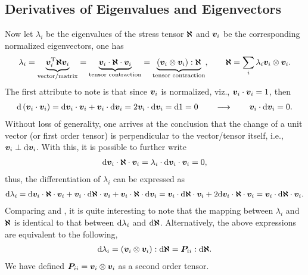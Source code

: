 \subsection{Derivatives of Eigenvalues and Eigenvectors}\label{sec:derivative_eigen}
Now let $\lambda_i$ be the eigenvalues of the stress tensor $\bm{\aleph}$ and $\bm{v}_i$ be the corresponding normalized eigenvectors, one has
\begin{gather}\label{eq:eigenvalue_def}
    \lambda_i=\underbrace{\bm{v}_i^{\mathrm{T}}\bm{\aleph}\bm{v}_i}_{\text{vector/matrix}}=\underbrace{\bm{v}_i\cdot\bm{\aleph}\cdot\bm{v}_i}_{\text{tensor contraction}}=\underbrace{\left(\bm{v}_i\otimes\bm{v}_i\right):\bm{\aleph}}_{\text{tensor contraction}},\qquad
    \bm{\aleph}=\sum_{i}\lambda_i\bm{v}_i\otimes\bm{v}_i.
\end{gather}
The first attribute to note is that since $\bm{v}_i$ is normalized, viz., $\bm{v}_i\cdot\bm{v}_i=1$, then
\begin{gather}
    \mathrm{d}\left(\bm{v}_i\cdot\bm{v}_i\right)=\mathrm{d}\bm{v}_i\cdot\bm{v}_i+\bm{v}_i\cdot\mathrm{d}\bm{v}_i=2\bm{v}_i\cdot\mathrm{d}\bm{v}_i=\mathrm{d}1=0\qquad\longrightarrow\qquad\bm{v}_i\cdot\mathrm{d}\bm{v}_i=0.
\end{gather}
Without loss of generality, one arrives at the conclusion that the change of a unit vector (or first order tensor) is perpendicular to the vector/tensor itself, i.e., $\bm{v}_i\perp\mathrm{d}\bm{v}_i$.
With this, it is possible to further write
\begin{gather}
    \mathrm{d}\bm{v}_i\cdot\bm{\aleph}\cdot\bm{v}_i=\lambda_i\cdot\mathrm{d}\bm{v}_i\cdot\bm{v}_i=0,
\end{gather}
thus, the differentiation of $\lambda_i$ can be expressed as
\begin{gather}\label{eq:eigenvalue_diff_def}
    \mathrm{d}\lambda_i=\mathrm{d}\bm{v}_i\cdot\bm{\aleph}\cdot\bm{v}_i+\bm{v}_i\cdot\mathrm{d}\bm{\aleph}\cdot\bm{v}_i+\bm{v}_i\cdot\bm{\aleph}\cdot\mathrm{d}\bm{v}_i=\bm{v}_i\cdot\mathrm{d}\bm{\aleph}\cdot\bm{v}_i+2\mathrm{d}\bm{v}_i\cdot\bm{\aleph}\cdot\bm{v}_i=\bm{v}_i\cdot\mathrm{d}\bm{\aleph}\cdot\bm{v}_i.
\end{gather}
Comparing  and , it is quite interesting to note that the mapping between $\lambda_i$ and $\bm{\aleph}$ is identical to that between $\mathrm{d}\lambda_i$ and $\mathrm{d}\bm{\aleph}$.
Alternatively, the above expressions are equivalent to the following,
\begin{gather}
    \mathrm{d}\lambda_i=\left(\bm{v}_i\otimes\bm{v}_i\right):\mathrm{d}\bm{\aleph}=\bm{P}_{ii}:\mathrm{d}\bm{\aleph}.
\end{gather}
We have defined $\bm{P}_{ii}=\bm{v}_i\otimes\bm{v}_i$ as a second order tensor.
